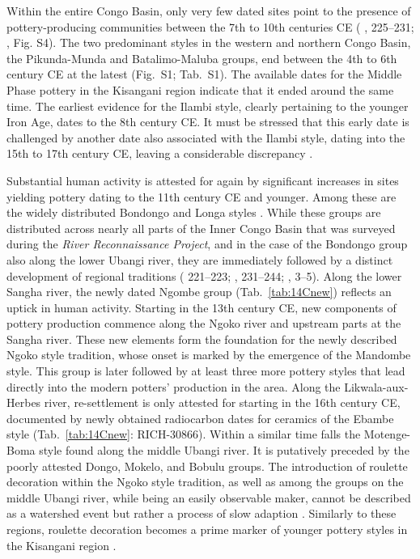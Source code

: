 \documentclass[smallextended,natbib]{svjour3}       %
\begin{document}
Within the entire Congo Basin, only very few dated sites point to the presence of pottery-producing communities between the 7th to 10th centuries CE (\citeauthor{Seidensticker.2021e} \citeyear{Seidensticker.2021e}, 225--231; \citeauthor{Seidensticker.2021} \citeyear{Seidensticker.2021}, Fig. S4). The two predominant styles in the western and northern Congo Basin, the Pikunda-Munda and Batalimo-Maluba groups, end between the 4th to 6th century CE at the latest (Fig.~S1; Tab.~S1). The available dates for the Middle Phase pottery in the Kisangani region indicate that it ended around the same time. The earliest evidence for the Ilambi style, clearly pertaining to the younger Iron Age, dates to the 8th century CE. It must be stressed that this early date is challenged by another date also associated with the Ilambi style, dating into the 15th to 17th century CE, leaving a considerable discrepancy \citep[98 Tab.~1]{LivingstoneSmith.2017}.

Substantial human activity is attested for again by significant increases in sites yielding pottery dating to the 11th century CE and younger. Among these are the widely distributed Bondongo and Longa styles \citep[Fig.~\ref{fig:chrono}; S1; Tab.~S1;][121--139]{Wotzka.1995}. While these groups are distributed across nearly all parts of the Inner Congo Basin that was surveyed during the \textit{River Reconnaissance Project}, and in the case of the Bondongo group also along the lower Ubangi river, they are immediately followed by a distinct development of regional traditions (\citeauthor{Wotzka.1995} \citeyear{Wotzka.1995} 221--223; \citeauthor{Seidensticker.2021e} \citeyear{Seidensticker.2021e}, 231--244; \citeauthor{Seidensticker.2021} \citeyear{Seidensticker.2021}, 3--5). Along the lower Sangha river, the newly dated Ngombe group (Tab.~\ref{tab:14Cnew}) reflects an uptick in human activity. Starting in the 13th century CE, new components of pottery production commence along the Ngoko river and upstream parts at the Sangha river. These new elements form the foundation for the newly described Ngoko style tradition, whose onset is marked by the emergence of the Mandombe style. This group is later followed by at least three more pottery styles that lead directly into the modern potters’ production in the area. Along the Likwala-aux-Herbes river, re-settlement is only attested for starting in the 16th century CE, documented by newly obtained radiocarbon dates for ceramics of the Ebambe style (Tab.~\ref{tab:14Cnew}: RICH-30866). Within a similar time falls the Motenge-Boma style found along the middle Ubangi river. It is putatively preceded by the poorly attested Dongo, Mokelo, and Bobulu groups. The introduction of roulette decoration within the Ngoko style tradition, as well as among the groups on the middle Ubangi river, while being an easily observable maker, cannot be described as a watershed event but rather a process of slow adaption \citep[120--123]{Seidensticker.2016b}. Similarly to these regions, roulette decoration becomes a prime marker of younger pottery styles in the Kisangani region \citep{LivingstoneSmith.2017}. 
\end{document}

